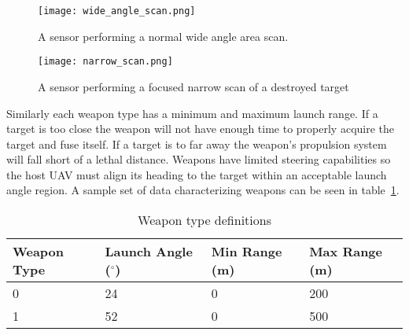 \begin{figure}[H]
	\centering
	\texttt{[image: wide\_angle\_scan.png]}
	\caption{A sensor performing a normal wide angle area scan.}
	\label{fig:wide_angle_scan}
\end{figure}

\begin{figure}[H]
	\centering
	\texttt{[image: narrow\_scan.png]}
	\caption{A sensor performing a focused narrow scan of a destroyed target}
	\label{fig:narrow_scan}
\end{figure}

Similarly each weapon type has a minimum and maximum launch range.  If a target is too close the weapon will not have enough time to properly acquire the target and fuse itself.  If a target is to far away the weapon's propulsion system will fall short of a lethal distance.  Weapons have limited steering capabilities so the host UAV must align its heading to the target within an acceptable launch angle region. A sample set of data characterizing weapons can be seen in table~\ref{tab:weaponType}.


\begin{table}[H]
	\caption{Weapon type definitions}
	\centering
	\label{tab:weaponType}
	\begin{tabular}{|p{1.4cm}|p{1.6cm}|p{1.2cm}|p{1.2cm}|}
		\hline
		Weapon Type & Launch Angle ($^{\circ}$) & Min Range (m) & Max Range (m)\\ \hline
		0 & 24 & 0 & 200 \\
		1 & 52 & 0 & 500 \\
		\hline
	\end{tabular}
\end{table}


